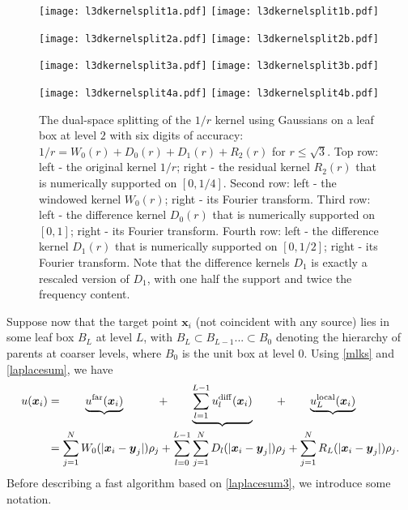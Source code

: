 \documentclass[final,letterpaper]{siamart171218}
\newcommand{\be}{\begin{equation}}
\newcommand{\ee}{\end{equation}}
\newcommand{\ba}{\begin{aligned}}
\newcommand{\ea}{\end{aligned}}
\newcommand{\x}{\boldsymbol{x}}
\newcommand{\y}{\boldsymbol{y}}
\begin{document}
\begin{figure}[!ht]
\centering
\texttt{[image: l3dkernelsplit1a.pdf]}\hspace{4mm}
\texttt{[image: l3dkernelsplit1b.pdf]}

\vspace{4mm}

\texttt{[image: l3dkernelsplit2a.pdf]}\hspace{4mm}
\texttt{[image: l3dkernelsplit2b.pdf]}

\vspace{4mm}

\texttt{[image: l3dkernelsplit3a.pdf]}\hspace{4mm}
\texttt{[image: l3dkernelsplit3b.pdf]}

\vspace{4mm}

\texttt{[image: l3dkernelsplit4a.pdf]}\hspace{4mm}
\texttt{[image: l3dkernelsplit4b.pdf]}
\caption{\sf The dual-space splitting of the $1/r$ kernel 
  using Gaussians on a leaf box at level $2$
  with six digits of accuracy:
  $1/r=W_0(r)+D_0(r)+D_1(r)+R_2(r)$ for $r\le \sqrt{3}$.
  Top row: left - the original kernel $1/r$; right - the residual kernel $R_2(r)$
  that is numerically supported on $[0,1/4]$. Second row: left -
  the windowed kernel $W_0(r)$;
  right - its Fourier transform. Third row: left - the difference kernel $D_0(r)$ that
  is numerically supported on $[0, 1]$; right - its
  Fourier transform. Fourth row: left - the difference kernel $D_1(r)$ that is
  numerically 
  supported on $[0, 1/2]$; right - its Fourier
  transform. Note that the difference kernels $D_1$ is exactly a rescaled version
  of $D_1$, with one half the support and twice the frequency content. }
\label{l3dkernelsplit}
\end{figure}


Suppose now that the target point $\x_i$ (not coincident with any source)
lies in some leaf box $B_{L}$ at level $L$,
with $B_L \subset B_{L-1} ... \subset B_0$ denoting the hierarchy of parents at
coarser levels, where $B_0$ is the unit box at level 0.
Using \cref{mlks} and \cref{laplacesum}, we have
\be\label{laplacesum3}
\ba
u(\x_i)&= \qquad
\underbrace{u^{\rm far}(\x_i)}\qquad\quad +\qquad
\underbrace{\sum_{l=1}^{L-1}u_{l}^{\rm diff}(\x_i)}\qquad +\qquad 
\underbrace{u_{L}^{\rm local}(\x_i)}\\
&=
\sum_{j=1}^{N}W_0(|\x_i-\y_j|)\rho_j + \sum_{l=0}^{L-1}\sum_{j=1}^{N}D_l(|\x_i-\y_j|)\rho_j
+\sum_{j=1}^{N}R_L(|\x_i-\y_j|)\rho_j.
\ea
\ee
Before describing a fast algorithm based on \cref{laplacesum3}, we introduce
some notation.
\end{document}
